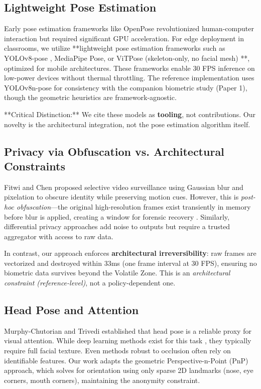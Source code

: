 \documentclass[conference]{IEEEtran}
\begin{document}
\subsection{Lightweight Pose Estimation}
Early pose estimation frameworks like OpenPose \cite{b10} revolutionized human-computer interaction but required significant GPU acceleration. For edge deployment in classrooms, we utilize **lightweight pose estimation frameworks such as YOLOv8-pose \cite{b23}, MediaPipe Pose, or ViTPose (skeleton-only, no facial mesh) \cite{b6, b11, b12}**, optimized for mobile architectures. These frameworks enable 30 FPS inference on low-power devices without thermal throttling. The reference implementation uses YOLOv8n-pose for consistency with the companion biometric study (Paper 1), though the geometric heuristics are framework-agnostic.

**Critical Distinction:** We cite these models as \textbf{tooling}, not contributions. Our novelty is the architectural integration, not the pose estimation algorithm itself.

\subsection{Privacy via Obfuscation vs. Architectural Constraints}
Fitwi and Chen \cite{b3} proposed selective video surveillance using Gaussian blur and pixelation to obscure identity while preserving motion cues. However, this is \textit{post-hoc obfuscation}—the original high-resolution frames exist transiently in memory before blur is applied, creating a window for forensic recovery \cite{b21}. Similarly, differential privacy approaches \cite{b5} add noise to outputs but require a trusted aggregator with access to raw data.

In contrast, our approach enforces \textbf{architectural irreversibility}: raw frames are vectorized and destroyed within 33ms (one frame interval at 30 FPS), ensuring no biometric data survives beyond the Volatile Zone. This is an \textit{architectural constraint (reference-level)}, not a policy-dependent one.

\subsection{Head Pose and Attention}
Murphy-Chutorian and Trivedi \cite{b13} established that head pose is a reliable proxy for visual attention. While deep learning methods exist for this task \cite{b14}, they typically require full facial texture. Even methods robust to occlusion \cite{b15} often rely on identifiable features. Our work adapts the geometric Perspective-n-Point (PnP) approach, which solves for orientation using only sparse 2D landmarks (nose, eye corners, mouth corners), maintaining the anonymity constraint.
\end{document}
